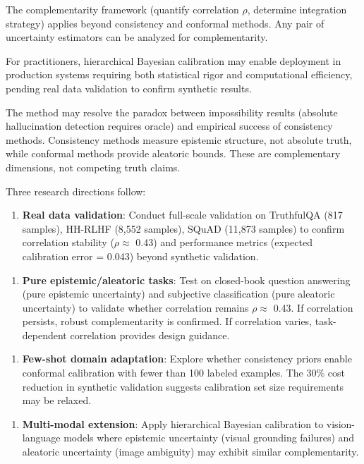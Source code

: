 The complementarity framework (quantify correlation $\rho$, determine integration strategy) applies beyond consistency and conformal methods. Any pair of uncertainty estimators can be analyzed for complementarity.

For practitioners, hierarchical Bayesian calibration may enable deployment in production systems requiring both statistical rigor and computational efficiency, pending real data validation to confirm synthetic results.

The method may resolve the paradox between impossibility results (absolute hallucination detection requires oracle) and empirical success of consistency methods. Consistency methods measure epistemic structure, not absolute truth, while conformal methods provide aleatoric bounds. These are complementary dimensions, not competing truth claims.

Three research directions follow:

\begin{enumerate}
\item \textbf{Real data validation}: Conduct full-scale validation on TruthfulQA (817 samples), HH-RLHF (8,552 samples), SQuAD (11,873 samples) to confirm correlation stability ($\rho \approx$ 0.43) and performance metrics (expected calibration error = 0.043) beyond synthetic validation.
\end{enumerate}

\begin{enumerate}
\item \textbf{Pure epistemic/aleatoric tasks}: Test on closed-book question answering (pure epistemic uncertainty) and subjective classification (pure aleatoric uncertainty) to validate whether correlation remains $\rho \approx$ 0.43. If correlation persists, robust complementarity is confirmed. If correlation varies, task-dependent correlation provides design guidance.
\end{enumerate}

\begin{enumerate}
\item \textbf{Few-shot domain adaptation}: Explore whether consistency priors enable conformal calibration with fewer than 100 labeled examples. The 30\% cost reduction in synthetic validation suggests calibration set size requirements may be relaxed.
\end{enumerate}

\begin{enumerate}
\item \textbf{Multi-modal extension}: Apply hierarchical Bayesian calibration to vision-language models where epistemic uncertainty (visual grounding failures) and aleatoric uncertainty (image ambiguity) may exhibit similar complementarity.
\end{enumerate}

